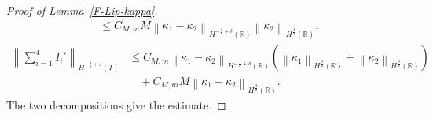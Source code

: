 \documentclass[11pt,reqno]{amsart}
\theoremstyle{plain}
\theoremstyle{definition}
\numberwithin{equation}{section}
\newcommand{\paren}[1]{\left(#1\right)}
\newcommand{\norm}[1]{\left\lVert #1 \right\rVert}
\newcommand{\R}{\mathbb{R}}
\newcommand{\hi}[1]{H^{#1}(I)}
\newcommand{\hr}[1]{H^{#1}(\R)}
\begin{document}
\begin{proof}[Proof of Lemma~\ref{F-Lip-kappa}]
\begin{equation}
\begin{aligned}
    &\le C_{M,m}M \norm{\kappa_1-\kappa_2}_{\hr{-\frac{1}{2}+\delta}}\norm{\kappa_2}_{\hr{\frac{3}{2}}}.
\end{aligned}
\end{equation}
\begin{equation}
\begin{aligned}
    \norm{\sum_{i=1}^4 I_i'}_{\hi{-\frac{1}{2}+\varepsilon}}
    &\le C_{M,m}
    \norm{\kappa_1-\kappa_2}_{\hr{-\frac{1}{2}+\delta}}
    \paren{
        \norm{\kappa_1}_{\hr{\frac{3}{2}}}
        +\norm{\kappa_2}_{\hr{\frac{3}{2}}}
    } \\
    &\quad+ C_{M,m}M
    \norm{\kappa_1-\kappa_2}_{\hr{\frac{3}{2}}}.
\end{aligned}
\end{equation}
The two decompositions give the estimate.
\end{proof}
\end{document}
